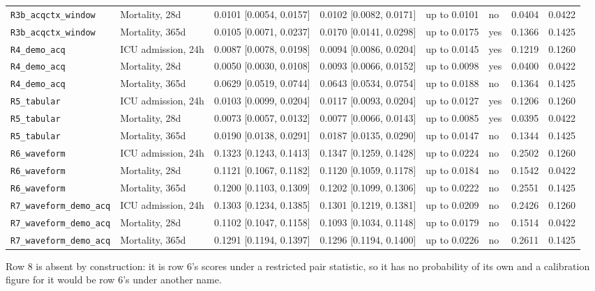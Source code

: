 \begin{table}[t]
\begin{tabular}{llllllll}
\texttt{R3b\_acqctx\_window} & Mortality, 28d & 0.0101 [0.0054, 0.0157] & 0.0102 [0.0082, 0.0171] & up to 0.0101 & no & 0.0404 & 0.0422 \\
\texttt{R3b\_acqctx\_window} & Mortality, 365d & 0.0105 [0.0071, 0.0237] & 0.0170 [0.0141, 0.0298] & up to 0.0175 & yes & 0.1366 & 0.1425 \\
\texttt{R4\_demo\_acq} & ICU admission, 24h & 0.0087 [0.0078, 0.0198] & 0.0094 [0.0086, 0.0204] & up to 0.0145 & yes & 0.1219 & 0.1260 \\
\texttt{R4\_demo\_acq} & Mortality, 28d & 0.0050 [0.0030, 0.0108] & 0.0093 [0.0066, 0.0152] & up to 0.0098 & yes & 0.0400 & 0.0422 \\
\texttt{R4\_demo\_acq} & Mortality, 365d & 0.0629 [0.0519, 0.0744] & 0.0643 [0.0534, 0.0754] & up to 0.0188 & no & 0.1364 & 0.1425 \\
\texttt{R5\_tabular} & ICU admission, 24h & 0.0103 [0.0099, 0.0204] & 0.0117 [0.0093, 0.0204] & up to 0.0127 & yes & 0.1206 & 0.1260 \\
\texttt{R5\_tabular} & Mortality, 28d & 0.0073 [0.0057, 0.0132] & 0.0077 [0.0066, 0.0143] & up to 0.0085 & yes & 0.0395 & 0.0422 \\
\texttt{R5\_tabular} & Mortality, 365d & 0.0190 [0.0138, 0.0291] & 0.0187 [0.0135, 0.0290] & up to 0.0147 & no & 0.1344 & 0.1425 \\
\texttt{R6\_waveform} & ICU admission, 24h & 0.1323 [0.1243, 0.1413] & 0.1347 [0.1259, 0.1428] & up to 0.0224 & no & 0.2502 & 0.1260 \\
\texttt{R6\_waveform} & Mortality, 28d & 0.1121 [0.1067, 0.1182] & 0.1120 [0.1059, 0.1178] & up to 0.0184 & no & 0.1542 & 0.0422 \\
\texttt{R6\_waveform} & Mortality, 365d & 0.1200 [0.1103, 0.1309] & 0.1202 [0.1099, 0.1306] & up to 0.0222 & no & 0.2551 & 0.1425 \\
\texttt{R7\_waveform\_demo\_acq} & ICU admission, 24h & 0.1303 [0.1234, 0.1385] & 0.1301 [0.1219, 0.1381] & up to 0.0209 & no & 0.2426 & 0.1260 \\
\texttt{R7\_waveform\_demo\_acq} & Mortality, 28d & 0.1102 [0.1047, 0.1158] & 0.1093 [0.1034, 0.1148] & up to 0.0179 & no & 0.1514 & 0.0422 \\
\texttt{R7\_waveform\_demo\_acq} & Mortality, 365d & 0.1291 [0.1194, 0.1397] & 0.1296 [0.1194, 0.1400] & up to 0.0226 & no & 0.2611 & 0.1425 \\
\bottomrule
\end{tabular}
\par\footnotesize Row 8 is absent by construction: it is row 6's scores under a restricted pair statistic, so it has no probability of its own and a calibration figure for it would be row 6's under another name.

\end{table}

